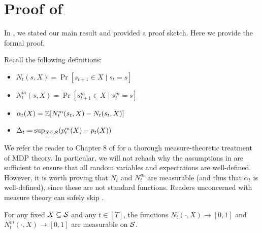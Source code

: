 \section{Proof of }\label{sec:main-proof}

In , we stated our main result and provided a proof sketch. Here we provide the formal proof.

Recall the following definitions:
\begin{itemize}
    \item $N_t(s, X) = \Pr[s_{t+1} \in X \mid s_t = s]$
    \item $N_t^m(s, X) = \Pr[s_{t+1}^m \in X \mid s_t^m = s]$
    \item $\alpha_t(X) = \operatorname*{\mathbb{E}}[N_t^m(s_t, X) - N_t(s_t, X)]$ 
    \item $\Delta_t = \sup_{X\subseteq \mathcal{S}} (p_t^m(X) - p_t(X))$
\end{itemize}

We refer the reader to Chapter 8 of \citet{bertsekas1996stochastic} for a thorough measure-theoretic treatment of MDP theory. In particular, we will not rehash why the assumptions in  are sufficient to ensure that all random variables and expectations are well-defined. However, it is worth proving that $N_t$ and $N_t^m$ are measurable (and thus that $\alpha_t$ is well-defined), since these are not standard functions. Readers unconcerned with measure theory can safely skip .


\begin{proposition}
\label{prop:measure}
For any fixed $X\subseteq\mathcal{S}$ and any $t \in [T]$, the functions $N_t(\cdot,X) \to [0,1]$ and $N_t^m(\cdot, X) \to [0,1]$ are measurable on $\mathcal{S}$.
\end{proposition}

